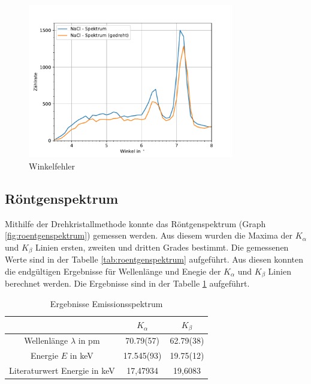 \documentclass[11pt, a4paper]{article}
\begin{document}
    \begin{figure}
        \centering
        \includegraphics[width=0.8\textwidth]{Winkelfehler.pdf}
        \caption{Winkelfehler}
        \label{fig:wink}
    \end{figure}

    \subsection{Röntgenspektrum} \label{ront}

    Mithilfe der Drehkristallmethode konnte das Röntgenspektrum (Graph \ref{fig:roentgenspektrum}) gemessen werden. Aus diesem wurden die Maxima der $K_{\alpha}$ und $K_{\beta}$ Linien ersten, zweiten und dritten Grades bestimmt. Die gemessenen Werte sind in der Tabelle \ref{tab:roentgenspektrum} aufgeführt. Aus diesen konnten die endgültigen Ergebnisse für Wellenlänge und Enegie der $K_{\alpha}$ und $K_{\beta}$ Linien berechnet werden. Die Ergebnisse sind in der Tabelle \ref{tab:linienerg} aufgeführt.

    \begin{table}
        \centering
        \caption{Ergebnisse Emissionsspektrum}
        \label{tab:linienerg}
        \begin{tabular}{c|c|c}
            & $K_{\alpha}$ & $K_{\beta}$ \\
            \hline
            Wellenlänge $\lambda$ in pm & 70.79(57) & 62.79(38) \\
            Energie $E$ in keV & 17.545(93) & 19.75(12) \\
            Literaturwert Energie \cite{lin} in keV & 17,47934 & 19,6083
        \end{tabular}
    \end{table}
\end{document}
